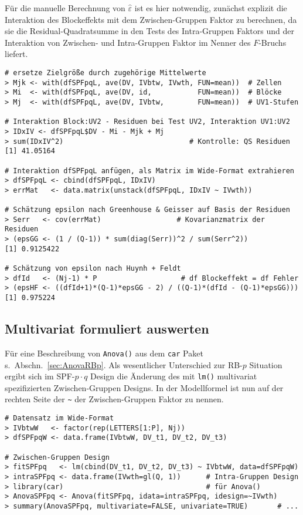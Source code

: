 Für die manuelle Berechnung von $\hat{\varepsilon}$ ist es hier notwendig, zunächst explizit die Interaktion des Blockeffekts mit dem Zwischen-Gruppen Faktor zu berechnen, da sie die Residual-Quadratsumme in den Tests des Intra-Gruppen Faktors und der Interaktion von Zwischen- und Intra-Gruppen Faktor im Nenner des $F$-Bruchs liefert.
\begin{lstlisting}
# ersetze Zielgröße durch zugehörige Mittelwerte
> Mjk <- with(dfSPFpqL, ave(DV, IVbtw, IVwth, FUN=mean))  # Zellen
> Mi  <- with(dfSPFpqL, ave(DV, id,           FUN=mean))  # Blöcke
> Mj  <- with(dfSPFpqL, ave(DV, IVbtw,        FUN=mean))  # UV1-Stufen

# Interaktion Block:UV2 - Residuen bei Test UV2, Interaktion UV1:UV2
> IDxIV <- dfSPFpqL$DV - Mi - Mjk + Mj
> sum(IDxIV^2)                              # Kontrolle: QS Residuen
[1] 41.05164

# Interaktion dfSPFpqL anfügen, als Matrix im Wide-Format extrahieren
> dfSPFpqL <- cbind(dfSPFpqL, IDxIV)
> errMat   <- data.matrix(unstack(dfSPFpqL, IDxIV ~ IVwth))

# Schätzung epsilon nach Greenhouse & Geisser auf Basis der Residuen
> Serr   <- cov(errMat)                  # Kovarianzmatrix der Residuen
> (epsGG <- (1 / (Q-1)) * sum(diag(Serr))^2 / sum(Serr^2))
[1] 0.9125422

# Schätzung von epsilon nach Huynh + Feldt
> dfId   <- (Nj-1) * P                    # df Blockeffekt = df Fehler
> (epsHF <- ((dfId+1)*(Q-1)*epsGG - 2) / ((Q-1)*(dfId - (Q-1)*epsGG)))
[1] 0.975224
\end{lstlisting}

\subsection{Multivariat formuliert auswerten}
\label{sec:SPFpqMult}

Für eine Beschreibung von \lstinline!Anova()! aus dem \lstinline!car! Paket s.\ Abschn.\ \ref{sec:AnovaRBp}. Als wesentlicher Unterschied zur RB-$p$ Situation ergibt sich im SPF-$p \cdot q$ Design die Änderung des mit \lstinline!lm()! multivariat spezifizierten Zwischen-Gruppen Designs. In der Modellformel ist nun auf der rechten Seite der \lstinline!~! der Zwischen-Gruppen Faktor zu nennen.
\begin{lstlisting}
# Datensatz im Wide-Format
> IVbtwW   <- factor(rep(LETTERS[1:P], Nj))
> dfSPFpqW <- data.frame(IVbtwW, DV_t1, DV_t2, DV_t3)

# Zwischen-Gruppen Design
> fitSPFpq   <- lm(cbind(DV_t1, DV_t2, DV_t3) ~ IVbtwW, data=dfSPFpqW)
> intraSPFpq <- data.frame(IVwth=gl(Q, 1))      # Intra-Gruppen Design
> library(car)                                  # für Anova()
> AnovaSPFpq <- Anova(fitSPFpq, idata=intraSPFpq, idesign=~IVwth)
> summary(AnovaSPFpq, multivariate=FALSE, univariate=TRUE)       # ...
\end{lstlisting}

